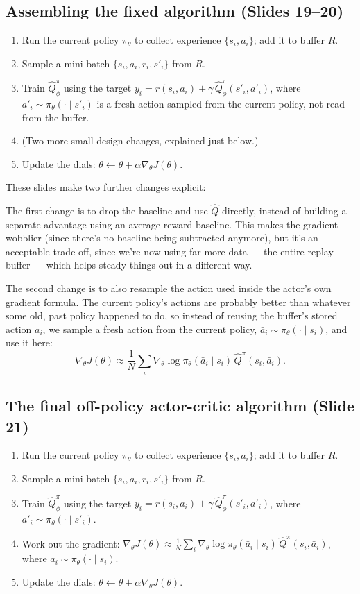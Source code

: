 \documentclass[11pt]{article}
\begin{document}
\subsection{Assembling the fixed algorithm (Slides 19--20)}
\begin{enumerate}[leftmargin=*]
  \item Run the current policy $\pi_\theta$ to collect experience $\{s_i,a_i\}$; add it to buffer $R$.
  \item Sample a mini-batch $\{s_i,a_i,r_i,s'_i\}$ from $R$.
  \item Train $\hat Q^\pi_\phi$ using the target $y_i = r(s_i,a_i) + \gamma\,\hat Q^\pi_\phi(s'_i,a'_i)$, where $a'_i \sim \pi_\theta(\cdot\mid s'_i)$ is a fresh action sampled from the current policy, not read from the buffer.
  \item (Two more small design changes, explained just below.)
  \item Update the dials: $\theta \leftarrow \theta + \alpha\nabla_\theta J(\theta)$.
\end{enumerate}
These slides make two further changes explicit:

The first change is to drop the baseline and use $\hat Q$ directly, instead of building a separate advantage using an average-reward baseline. This makes the gradient wobblier (since there's no baseline being subtracted anymore), but it's an acceptable trade-off, since we're now using far more data --- the entire replay buffer --- which helps steady things out in a different way.

The second change is to also resample the action used inside the actor's own gradient formula. The current policy's actions are probably better than whatever some old, past policy happened to do, so instead of reusing the buffer's stored action $a_i$, we sample a fresh action from the current policy, $\bar a_i \sim \pi_\theta(\cdot\mid s_i)$, and use it here:
$$\nabla_\theta J(\theta) \approx \frac{1}{N}\sum_i \nabla_\theta \log \pi_\theta(\bar a_i\mid s_i)\, \hat Q^\pi(s_i,\bar a_i).$$

\subsection{The final off-policy actor-critic algorithm (Slide 21)}
\begin{enumerate}[leftmargin=*]
  \item Run the current policy $\pi_\theta$ to collect experience $\{s_i,a_i\}$; add it to buffer $R$.
  \item Sample a mini-batch $\{s_i,a_i,r_i,s'_i\}$ from $R$.
  \item Train $\hat Q^\pi_\phi$ using the target $y_i = r(s_i,a_i) + \gamma\, \hat Q^\pi_\phi(s'_i,a'_i)$, where $a'_i \sim \pi_\theta(\cdot\mid s'_i)$.
  \item Work out the gradient: $\nabla_\theta J(\theta) \approx \frac{1}{N}\sum_i \nabla_\theta\log\pi_\theta(\bar a_i\mid s_i)\, \hat Q^\pi(s_i,\bar a_i)$, where $\bar a_i \sim \pi_\theta(\cdot\mid s_i)$.
  \item Update the dials: $\theta \leftarrow \theta + \alpha\nabla_\theta J(\theta)$.
\end{enumerate}
\end{document}
